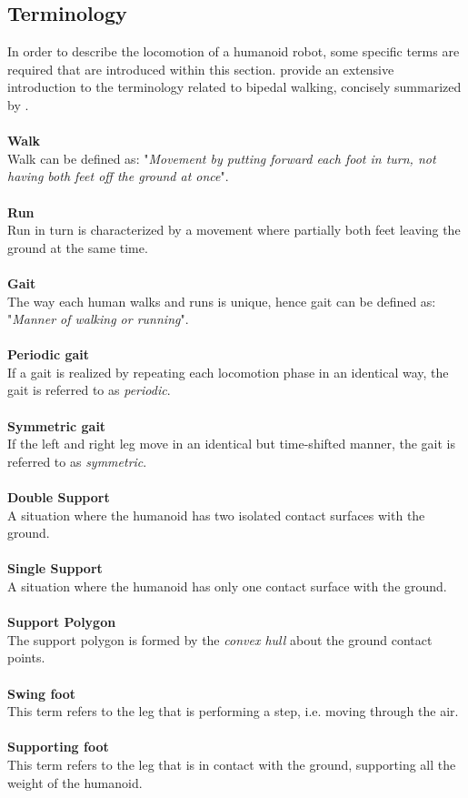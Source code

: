 \subsection{Terminology}
In order to describe the locomotion of a humanoid robot, some specific terms are required that are introduced within this section. \citeauthor{vukobratovic2007towards} provide an extensive introduction to the terminology related to bipedal walking, concisely summarized by \citeauthor{dekker2009zero} \cite{vukobratovic2007towards, dekker2009zero}.\\\\
\textbf{Walk}\\
Walk can be defined as: "\textit{Movement by putting forward each foot in turn, not having both feet off the ground at once}".\\\\
\textbf{Run}\\
Run in turn is characterized by  a movement where partially both feet leaving the ground at the same time.\\\\
\textbf{Gait}\\
The way each human walks and runs is unique, hence gait can be defined as: "\textit{Manner of walking or running}".\\\\
\textbf{Periodic gait}\\
If a gait is realized by repeating each locomotion phase in an identical way, the gait is referred to as \textit{periodic}.\\\\
\textbf{Symmetric gait}\\
If the left and right leg move in an identical but time-shifted manner, the gait is referred to as \textit{symmetric}.\\\\
\textbf{Double Support}\\
A situation where the humanoid has two isolated contact surfaces with the ground.\\\\
\textbf{Single Support}\\
A situation where  the humanoid has only one contact surface with the ground.\\\\
\textbf{Support Polygon}\\%
The support polygon is formed by the \textit{convex hull} about the ground contact points.    \\\\
\textbf{Swing foot}\\
This term refers to the leg that is performing a step, i.e. moving through the air.\\\\
\textbf{Supporting foot}\\
This term refers to the leg that is in contact with the ground, supporting all the weight of the humanoid. 


